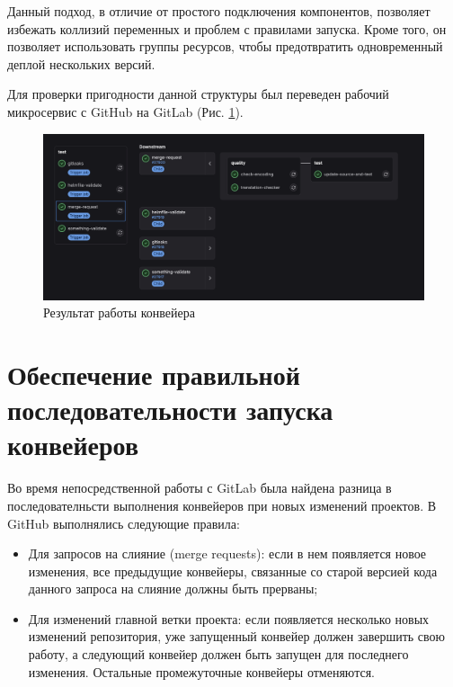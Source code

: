 Данный подход, в отличие от простого подключения компонентов, позволяет избежать коллизий переменных и проблем с правилами запуска.
Кроме того, он позволяет использовать группы ресурсов, чтобы предотвратить одновременный деплой нескольких версий.

Для проверки пригодности данной структуры был переведен рабочий микросервис с GitHub на GitLab (Рис. \ref{fig:pipeline-run-result}).

\begin{figure}[H]
  \centering
  \includegraphics[width=16cm]{img/pipeline-run-result}
  \caption{Результат работы конвейера}
  \label{fig:pipeline-run-result}
\end{figure}

\section{Обеспечение правильной последовательности запуска конвейеров}
Во время непосредственной работы с GitLab была найдена разница в последователньсти выполнения конвейеров при новых изменений проектов. В GitHub выполнялись следующие правила:
\begin{itemize}
  \item Для  запросов на слияние (merge requests): если в нем появляется новое изменения, все предыдущие конвейеры, связанные со старой версией кода данного запроса на слияние должны быть прерваны;
  \item Для изменений главной ветки проекта: если появляется несколько новых изменений репозитория, уже запущенный конвейер должен завершить свою работу, а следующий конвейер должен быть запущен для последнего изменения. Остальные промежуточные конвейеры отменяются.
\end{itemize}

